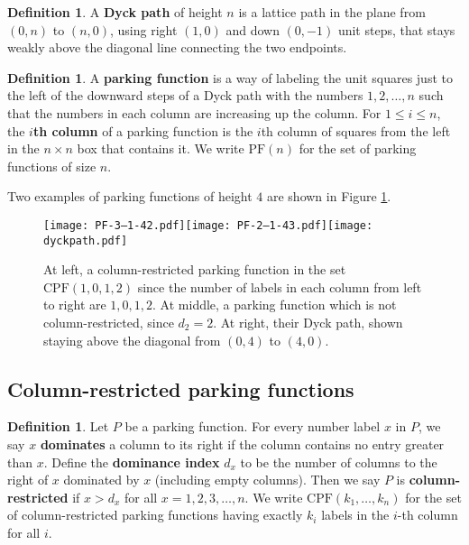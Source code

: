 \documentclass[11pt]{amsart}
\newcommand{\PF}{\mathrm{PF}}
\newcommand{\CPF}{\mathrm{CPF}}
\newcommand{\defn}{\textbf}
\numberwithin{thm}{section}
\numberwithin{equation}{section}
\numberwithin{figure}{section}
\theoremstyle{definition}
\newtheorem{definition}[thm]{Definition}
\begin{document}
\begin{definition}
A \textbf{Dyck path} of height $n$ is a lattice path in the plane from $(0,n)$ to $(n,0)$, using right $(1,0)$ and down $(0,-1)$ unit steps, that stays weakly above the diagonal line connecting the two endpoints. 
\end{definition}

\begin{definition}
A \textbf{parking function} is a way of labeling the unit squares just to the left of the downward steps of a Dyck path with the numbers $1,2,\ldots,n$ such that the numbers in each column are increasing up the column. For $1\leq i\leq n$, the \textbf{$i$th column} of a parking function is the $i$th column of squares from the left in the $n\times n$ box that contains it. We write $\PF(n)$ for the set of parking functions of size $n$.
\end{definition}

Two examples of parking functions of height $4$ are shown in Figure \ref{fig:PF}.

\begin{figure}
    \centering
    \texttt{[image: PF-3--1-42.pdf]}\hspace{2cm}\texttt{[image: PF-2--1-43.pdf]}\hspace{2cm}\texttt{[image: dyckpath.pdf]}
    \caption{\label{fig:PF}At left, a column-restricted parking function in the set $\CPF(1,0,1,2)$ since the number of labels in each column from left to right are $1,0,1,2$.  At middle, a parking function which is not column-restricted, since $d_2=2$.  At right, their Dyck path, shown staying above the diagonal from $(0,4)$ to $(4,0)$.} 
\end{figure}

\subsection{Column-restricted parking functions}\label{sec:CPFs}

\begin{definition}\label{def:column-restricted}
Let $P$ be a parking function.  For every number label $x$ in $P$, we say $x$ \defn{dominates} a column to its right if the column contains no entry greater than $x$. Define the \defn{dominance index} $d_x$ to be the number of columns to the right of $x$ dominated by $x$ (including empty columns).  Then we say $P$ is \textbf{column-restricted} if $x>d_x$ for all $x=1,2,3,\ldots,n$.  We write $\CPF(k_1,\ldots,k_n)$ for the set of column-restricted parking functions having exactly $k_i$ labels in the $i$-th column for all $i$.
\end{definition}
\end{document}
